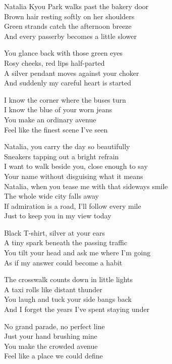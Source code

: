\begin{lyrics}
Natalia Kyou Park walks past the bakery door\\
Brown hair resting softly on her shoulders\\
Green strands catch the afternoon breeze\\
And every passerby becomes a little slower

You glance back with those green eyes\\
Rosy cheeks, red lips half-parted\\
A silver pendant moves against your choker\\
And suddenly my careful heart is started

I know the corner where the buses turn\\
I know the blue of your worn jeans\\
You make an ordinary avenue\\
Feel like the finest scene I've seen

Natalia, you carry the day so beautifully\\
Sneakers tapping out a bright refrain\\
I want to walk beside you, close enough to say\\
Your name without disguising what it means\\
Natalia, when you tease me with that sideways smile\\
The whole wide city falls away\\
If admiration is a road, I'll follow every mile\\
Just to keep you in my view today

Black T-shirt, silver at your ears\\
A tiny spark beneath the passing traffic\\
You tilt your head and ask me where I'm going\\
As if my answer could become a habit

The crosswalk counts down in little lights\\
A taxi rolls like distant thunder\\
You laugh and tuck your side bangs back\\
And I forget the years I've spent staying under

No grand parade, no perfect line\\
Just your hand brushing mine\\
You make the crowded avenue\\
Feel like a place we could define


\end{lyrics}
